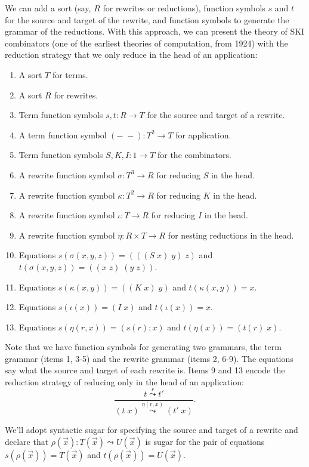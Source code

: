 \documentclass{article}
\begin{document}
We can add a sort (say, $R$ for rewrites or reductions), function symbols $s$ and $t$ for the source and target of the rewrite, and function symbols to generate the grammar of the reductions.  With this approach, we can present the theory of SKI combinators (one of the earliest theories of computation, from 1924) with the reduction strategy that we only reduce in the head of an application:
\begin{enumerate}
    \item A sort $T$ for terms.
    \item A sort $R$ for rewrites.
    \item Term function symbols $s, t\colon R \to T$ for the source and target of a rewrite.
    \item A term function symbol $(-\; -)\colon T^2 \to T$ for application.
    \item Term function symbols $S, K, I\colon 1 \to T$ for the combinators.
    \item A rewrite function symbol $\sigma\colon T^3 \to R$ for reducing $S$ in the head.
    \item A rewrite function symbol $\kappa\colon T^2 \to R$ for reducing $K$ in the head.
    \item A rewrite function symbol $\iota\colon T \to R$ for reducing $I$ in the head.
    \item A rewrite function symbol $\eta\colon R \times T \to R$ for nesting reductions in the head.
    \item Equations $s(\sigma(x, y, z)) = (((S\; x)\; y)\; z)$ and $t(\sigma(x, y, z)) = ((x\; z)\; (y\; z)).$
    \item Equations $s(\kappa(x, y)) = ((K\; x)\; y)$ and $t(\kappa(x, y)) = x.$
    \item Equations $s(\iota(x)) = (I\; x)$ and $t(\iota(x)) = x.$
    \item Equations $s(\eta(r, x)) = (s(r); x)$ and $t(\eta(x)) = (t(r)\; x).$
\end{enumerate}
Note that we have function symbols for generating two grammars, the term grammar (items 1, 3-5) and the rewrite grammar (items 2, 6-9).  The equations say what the source and target of each rewrite is.  Items 9 and 13 encode the reduction strategy of reducing only in the head of an application:
\[ \frac{t \stackrel{r}{\leadsto} t'}{(t\; x) \stackrel{\eta(r, x)}{\leadsto} (t'\; x)}. \]

We'll adopt syntactic sugar for specifying the source and target of a rewrite and declare that $\rho(\vec{x})\colon T(\vec{x}) \leadsto U(\vec{x})$ is sugar for the pair of equations $s(\rho(\vec{x})) = T(\vec{x})$ and $t(\rho(\vec{x})) = U(\vec{x}).$
\end{document}
